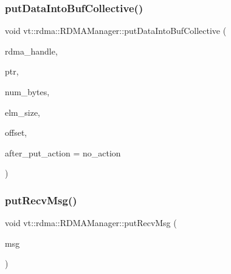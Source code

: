 \subsubsection{\texorpdfstring{put\+Data\+Into\+Buf\+Collective()}{putDataIntoBufCollective()}}
{\footnotesize\ttfamily void vt\+::rdma\+::\+R\+D\+M\+A\+Manager\+::put\+Data\+Into\+Buf\+Collective (\begin{DoxyParamCaption}\item[{\hyperlink{namespacevt_a10442579ec4e7ebef223818e64bcf908}{R\+D\+M\+A\+\_\+\+Handle\+Type} const \&}]{rdma\+\_\+handle,  }\item[{\hyperlink{namespacevt_a9e2c953286c7616f7c218e9951790776}{R\+D\+M\+A\+\_\+\+Ptr\+Type} const \&}]{ptr,  }\item[{\hyperlink{namespacevt_aab8d55968084610ce3b17057981e9300}{Byte\+Type} const \&}]{num\+\_\+bytes,  }\item[{\hyperlink{namespacevt_aab8d55968084610ce3b17057981e9300}{Byte\+Type} const \&}]{elm\+\_\+size,  }\item[{\hyperlink{namespacevt_aab8d55968084610ce3b17057981e9300}{Byte\+Type} const \&}]{offset,  }\item[{\hyperlink{namespacevt_ae0a5a7b18cc99d7b732cb4d44f46b0f3}{Action\+Type}}]{after\+\_\+put\+\_\+action = {\ttfamily no\+\_\+action} }\end{DoxyParamCaption})}

\mbox{\label{structvt_1_1rdma_1_1_r_d_m_a_manager_a87d44e05aeeb404290ac2a38b4631fe0}} 
\subsubsection{\texorpdfstring{put\+Recv\+Msg()}{putRecvMsg()}}
{\footnotesize\ttfamily void vt\+::rdma\+::\+R\+D\+M\+A\+Manager\+::put\+Recv\+Msg (\begin{DoxyParamCaption}\item[{\hyperlink{namespacevt_1_1rdma_ae0a0330c647ec5ac5d508750f4cd4a06}{Put\+Message} $\ast$}]{msg }\end{DoxyParamCaption})\hspace{0.3cm}{\ttfamily [static]}}

\mbox{\label{structvt_1_1rdma_1_1_r_d_m_a_manager_a2e34becca8d5f72a7d460e6574f8f623}} 
